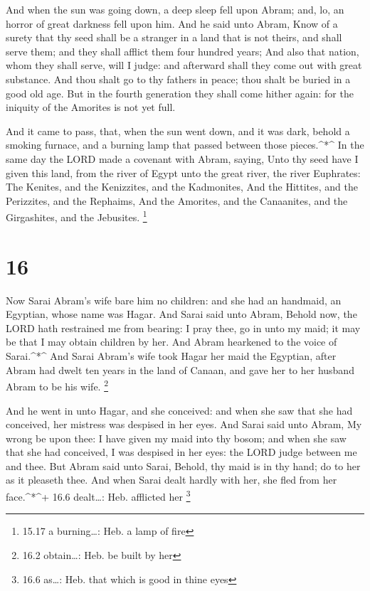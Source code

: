  And when the sun was going down, a deep sleep fell upon
Abram; and, lo, an horror of great darkness fell upon him. 
And he said unto Abram, Know of a surety that thy seed shall be a
stranger in a land that is not theirs, and shall serve them; and they
shall afflict them four hundred years;  And also that
nation, whom they shall serve, will I judge: and afterward shall they
come out with great substance.  And thou shalt go to thy
fathers in peace; thou shalt be buried in a good old age. 
But in the fourth generation they shall come hither again: for the
iniquity of the Amorites is not yet full.

 And it came to pass, that, when the sun went down, and it
was dark, behold a smoking furnace, and a burning lamp that passed
between those pieces.\^{}*\^{}  In the same day the LORD
made a covenant with Abram, saying, Unto thy seed have I given this
land, from the river of Egypt unto the great river, the river Euphrates:
 The Kenites, and the Kenizzites, and the Kadmonites,
 And the Hittites, and the Perizzites, and the Rephaims,
 And the Amorites, and the Canaanites, and the Girgashites,
and the Jebusites. \footnote{15.17 a burning\ldots: Heb. a lamp of fire}

\hypertarget{section-15}{%
\section{16}\label{section-15}}

 Now Sarai Abram's wife bare him no children: and she had an
handmaid, an Egyptian, whose name was Hagar.  And Sarai said
unto Abram, Behold now, the LORD hath restrained me from bearing: I pray
thee, go in unto my maid; it may be that I may obtain children by her.
And Abram hearkened to the voice of Sarai.\^{}*\^{}  And
Sarai Abram's wife took Hagar her maid the Egyptian, after Abram had
dwelt ten years in the land of Canaan, and gave her to her husband Abram
to be his wife. \footnote{16.2 obtain\ldots: Heb. be built by her}

 And he went in unto Hagar, and she conceived: and when she
saw that she had conceived, her mistress was despised in her eyes.
 And Sarai said unto Abram, My wrong be upon thee: I have
given my maid into thy bosom; and when she saw that she had conceived, I
was despised in her eyes: the LORD judge between me and thee.
 But Abram said unto Sarai, Behold, thy maid is in thy hand;
do to her as it pleaseth thee. And when Sarai dealt hardly with her, she
fled from her face.\^{}*\^{}+ 16.6 dealt\ldots: Heb. afflicted her
\footnote{16.6 as\ldots: Heb. that which is good in thine eyes}

